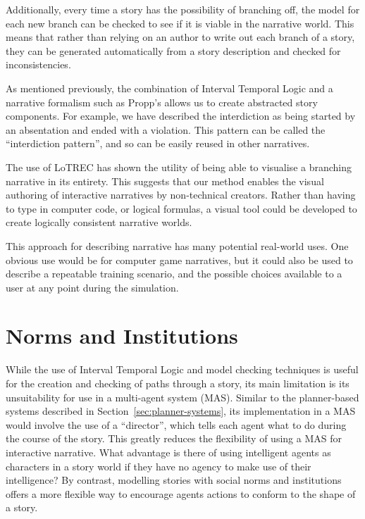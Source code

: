 \documentclass[11pt]{report}
\begin{document}
Additionally, every time a story has the possibility of branching off, the model for each new branch can be checked to see if it is viable in the narrative world. This means that rather than relying on an author to write out each branch of a story, they can be generated automatically from a story description and checked for inconsistencies.

As mentioned previously, the combination of Interval Temporal Logic and a narrative formalism such as Propp's allows us to create abstracted story components. For example, we have described the interdiction as being started by an absentation and ended with a violation. This pattern can be called the ``interdiction pattern'', and so can be easily reused in other narratives.

The use of LoTREC has shown the utility of being able to visualise a branching narrative in its entirety. This suggests that our method enables the visual authoring of interactive narratives by non-technical creators. Rather than having to type in computer code, or logical formulas, a visual tool could be developed to create logically consistent narrative worlds.

This approach for describing narrative has many potential real-world uses. One obvious use would be for computer game narratives, but it could also be used to describe a repeatable training scenario, and the possible choices available to a user at any point during the simulation.

\section{Norms and Institutions}
\label{sec:norms-and-institutions}

While the use of Interval Temporal Logic and model checking techniques is useful
for the creation and checking of paths through a story, its main limitation is
its unsuitability for use in a multi-agent system (MAS). Similar to the
planner-based systems described in Section~\ref{sec:planner-systems}, its implementation in a MAS
would involve the use of a ``director'', which tells each agent what to do
during the course of the story. This greatly reduces the flexibility of using a
MAS for interactive narrative. What advantage is there of using intelligent
agents as characters in a story world if they have no agency to make use of
their intelligence? By contrast, modelling stories with social norms and
institutions offers a more flexible way to encourage agents actions to conform
to the shape of a story.
\end{document}

